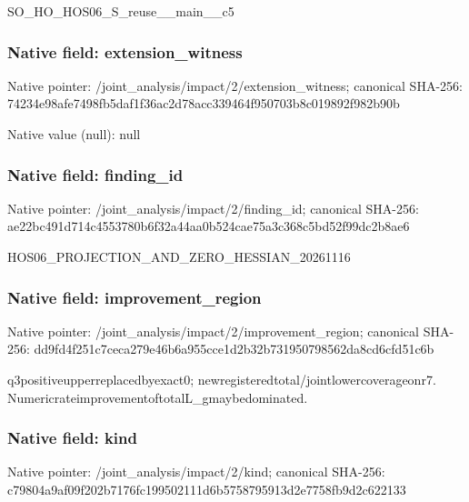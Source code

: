 \documentclass[10pt,a4paper]{article}
\begin{document}
\begingroup\raggedright\sloppy SO\_\allowbreak{}HO\_\allowbreak{}HOS06\_\allowbreak{}S\_\allowbreak{}reuse\_\allowbreak{}\_\allowbreak{}main\_\allowbreak{}\_\allowbreak{}c5\par\endgroup

\subsubsection{Native field: extension\_\allowbreak{}witness}
Native pointer: /joint\_\allowbreak{}analysis/impact/2/extension\_\allowbreak{}witness; canonical SHA-256: 74234e98afe7498fb5daf1f36ac2d78acc339464f950703b8c019892f982b90b

Native value (null): null

\subsubsection{Native field: finding\_\allowbreak{}id}
Native pointer: /joint\_\allowbreak{}analysis/impact/2/finding\_\allowbreak{}id; canonical SHA-256: ae22bc491d714c4553780b6f32a44aa0b524cae75a3c368c5bd52f99dc2b8ae6

\begingroup\raggedright\sloppy HOS06\_\allowbreak{}PROJECTION\_\allowbreak{}AND\_\allowbreak{}ZERO\_\allowbreak{}HESSIAN\_\allowbreak{}20261116\par\endgroup

\subsubsection{Native field: improvement\_\allowbreak{}region}
Native pointer: /joint\_\allowbreak{}analysis/impact/2/improvement\_\allowbreak{}region; canonical SHA-256: dd9fd4f251c7ceca279e46b6a955cce1d2b32b731950798562da8cd6cfd51c6b

\begingroup\raggedright\sloppy q3positiveupperreplacedbyexact0;\allowbreak{} newregisteredtotal/\allowbreak{}jointlowercoverageonr7. NumericrateimprovementoftotalL\_\allowbreak{}gmaybedominated.\par\endgroup

\subsubsection{Native field: kind}
Native pointer: /joint\_\allowbreak{}analysis/impact/2/kind; canonical SHA-256: c79804a9af09f202b7176fc199502111d6b5758795913d2e7758fb9d2c622133
\end{document}
